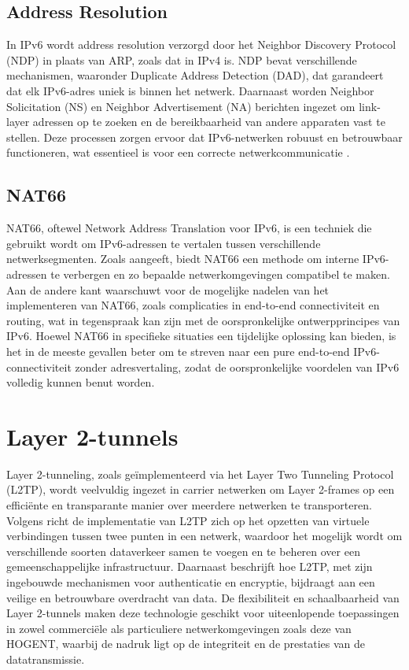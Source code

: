   \subsection{Address Resolution}
  In IPv6 wordt address resolution verzorgd door het Neighbor Discovery Protocol (NDP) in plaats van ARP, zoals dat in IPv4 is. 
  NDP bevat verschillende mechanismen, waaronder Duplicate Address Detection (DAD), dat garandeert dat elk IPv6-adres uniek is binnen het netwerk. 
  Daarnaast worden Neighbor Solicitation (NS) en Neighbor Advertisement (NA) berichten ingezet om link-layer adressen op te zoeken en de bereikbaarheid van andere apparaten vast te stellen. 
  Deze processen zorgen ervoor dat IPv6-netwerken robuust en betrouwbaar functioneren, wat essentieel is voor een correcte netwerkcommunicatie \textcite{NSA2023}.

  \subsection{NAT66}

  NAT66, oftewel Network Address Translation voor IPv6, is een techniek die gebruikt wordt om IPv6-adressen te vertalen tussen verschillende netwerksegmenten. 
  Zoals \textcite{Cilloni2018} aangeeft, biedt NAT66 een methode om interne IPv6-adressen te verbergen en zo bepaalde netwerkomgevingen compatibel te maken. 
  Aan de andere kant waarschuwt \textcite{Coffeen2016} voor de mogelijke nadelen van het implementeren van NAT66, zoals complicaties in end-to-end connectiviteit en routing, 
  wat in tegenspraak kan zijn met de oorspronkelijke ontwerpprincipes van IPv6. Hoewel NAT66 in specifieke situaties een tijdelijke oplossing kan bieden, 
  is het in de meeste gevallen beter om te streven naar een pure end-to-end IPv6-connectiviteit zonder adresvertaling, zodat de oorspronkelijke voordelen van IPv6 volledig kunnen benut worden.


  \section{Layer 2-tunnels}
  \label{sec:layer 2-tunnels}

  Layer 2-tunneling, zoals geïmplementeerd via het Layer Two Tunneling Protocol (L2TP), wordt veelvuldig ingezet in carrier netwerken om Layer 2-frames op een efficiënte en transparante manier over meerdere netwerken te transporteren. 
  Volgens \textcite{Hu2011} richt de implementatie van L2TP zich op het opzetten van virtuele verbindingen tussen twee punten in een netwerk, 
  waardoor het mogelijk wordt om verschillende soorten dataverkeer samen te voegen en te beheren over een gemeenschappelijke infrastructuur. 
  Daarnaast beschrijft \textcite{Zola2021} hoe L2TP, met zijn ingebouwde mechanismen voor authenticatie en encryptie, bijdraagt aan een veilige en betrouwbare overdracht van data. 
  De flexibiliteit en schaalbaarheid van Layer 2-tunnels maken deze technologie geschikt voor uiteenlopende toepassingen in zowel commerciële als particuliere netwerkomgevingen zoals deze van HOGENT, 
  waarbij de nadruk ligt op de integriteit en de prestaties van de datatransmissie.
  

